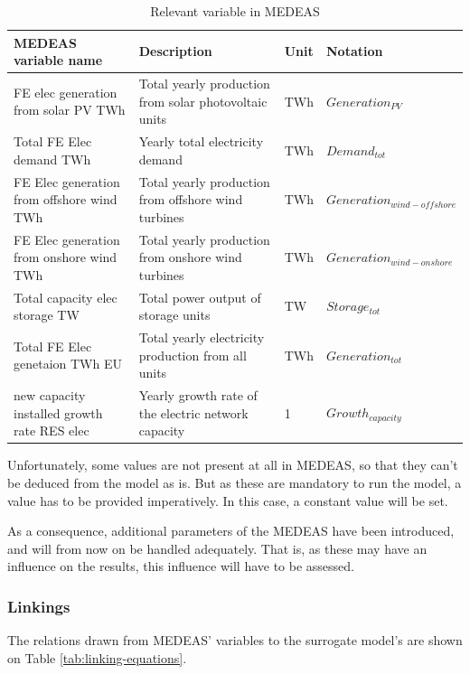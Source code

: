 \begin{table}[h]
    \centering
    \begin{tabular}{|p{5cm}|p{5cm}|p{1cm}|p{4cm}|} \hline 
    MEDEAS variable name &  Description & Unit & Notation \\ \hline
     FE elec generation from solar PV TWh & Total yearly production from solar photovoltaic units & TWh & $Generation_{PV}$\\ \hline 
     Total FE Elec demand TWh & Yearly total electricity demand & TWh & $Demand_{tot}$ \\ \hline 
     FE Elec generation from offshore wind TWh & Total yearly production from offshore wind turbines & TWh & $Generation_{wind-offshore}$ \\ \hline 
     FE Elec generation from onshore wind TWh & Total yearly production from onshore wind turbines & TWh & $Generation_{wind-onshore}$ \\ \hline 
     Total capacity elec storage TW & Total power output of storage units & TW & $Storage_{tot}$ \\ \hline 
     Total FE Elec genetaion TWh EU & Total yearly electricity production from all units & TWh & $Generation_{tot}$ \\ \hline 
     new capacity installed growth rate RES elec & Yearly growth rate of the electric network capacity & 1 & $Growth_{capacity}$ \\ \hline
    \end{tabular}
    \caption{Relevant variable in MEDEAS}
    \label{tab:medeas-vars}
\end{table}

Unfortunately, some values are not present at all in MEDEAS, so that they can't be deduced from the model as is. But as these are mandatory to run the model, a value has to be provided imperatively. In this case, a constant value will be set.

As a consequence, additional parameters of the MEDEAS have been introduced, and will from now on be handled adequately. That is, as these may have an influence on the results, this influence will have to be assessed.

\subsubsection{Linkings}

The relations drawn from MEDEAS' variables to the surrogate model's are shown on Table \ref{tab:linking-equations}.

